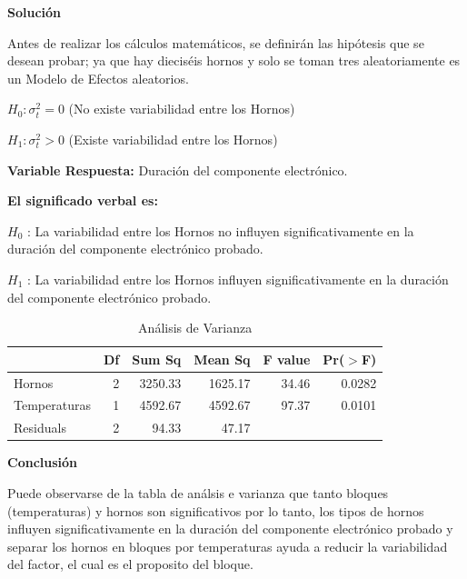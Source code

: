 \documentclass[12pt,letterpaper]{report}
\begin{document}
\textbf{Solución}

Antes de realizar los cálculos matemáticos, se definirán las hipótesis que se desean probar; ya
que hay dieciséis hornos y solo se toman tres aleatoriamente es un Modelo de Efectos
aleatorios.

$H_0 : \sigma^{2}_t = 0$ (No existe variabilidad entre los Hornos)

$H_1 : \sigma^{2}_t > 0$ (Existe variabilidad entre los Hornos)

\textbf{Variable Respuesta:} Duración del componente electrónico.

\textbf{El significado verbal es:}

$H_0$ : La variabilidad entre los Hornos no influyen significativamente en la duración del
componente electrónico probado.

$H_1$ : La variabilidad entre los Hornos influyen significativamente en la duración del componente
electrónico probado.

\begin{Schunk}
\end{Schunk}

\begin{table}[ht]
\centering
\begin{tabular}{lrrrrr}
  \hline
 & Df & Sum Sq & Mean Sq & F value & Pr($>$F) \\ 
  \hline
Hornos & 2 & 3250.33 & 1625.17 & 34.46 & 0.0282 \\ 
Temperaturas & 1 & 4592.67 & 4592.67 & 97.37 & 0.0101 \\ 
  Residuals & 2 & 94.33 & 47.17 &  &  \\ 
   \hline
\end{tabular}
\caption{Análisis de Varianza}
\end{table}

\textbf{Conclusión}

Puede observarse de la tabla de análsis e varianza que tanto bloques (temperaturas) y hornos son significativos por lo tanto, los tipos de hornos influyen significativamente en la duración del componente electrónico probado y separar los hornos en bloques por temperaturas ayuda a reducir la variabilidad del factor, el cual es el proposito del bloque.
\end{document}
